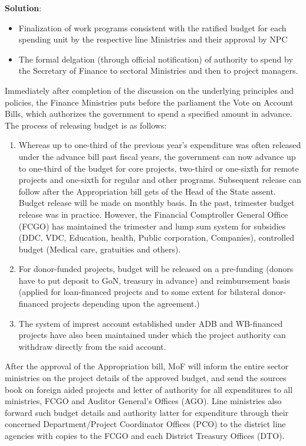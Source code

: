 \documentclass[
]{book}
\newenvironment{solution}{ {\bfseries Solution}:}{}
\begin{document}
\begin{questions}
\begin{solution}
\begin{itemize}
\item Finalization of work programs consistent with the ratified budget for each spending unit by the respective line Ministries and their approval by NPC
\item The formal delgation (through official notification) of authority to spend by the Secretary of Finance to sectoral Ministries and then to project managers.
\end{itemize}

Immediately after completion of the discussion on the underlying principles and policies, the Finance Ministries puts before the parliament the Vote on Account Bills, which authorizes the government to spend a specified amount in advance. The process of releasing budget is as follows:

\begin{enumerate}
\item Whereas up to one-third of the previous year's expenditure was often released under the advance bill past fiscal years, the government can now advance up to one-third of the budget for core projects, two-third or one-sixth for remote projects and one-sixth for regular and other programs. Subsequent release can follow after the Appropriation bill gets of the Head of the State assent. Budget release will be made on monthly basis. In the past, trimester budget release was in practice. However, the Financial Comptroller General Office (FCGO) has maintained the trimester and lump sum system for subsidies (DDC, VDC, Education, health, Public corporation, Companies), controlled budget (Medical care, gratuities and others).
\item For donor-funded projects, budget will be released on a pre-funding (donors have to put deposit to GoN, treasury in advance) and reimbursement basis (applied for loan-financed projects and to some extent for bilateral donor-financed projects depending upon the agreement.)
\item The system of imprest account established under ADB and WB-financed projects have also been maintained under which the project authority can withdraw directly from the said account.
\end{enumerate}

After the approval of the Appropriation bill, MoF will inform the entire sector ministries on the project details of the approved budget, and send the sources book on foreign aided projects and letter of authority for all expenditures to all ministries, FCGO and Auditor General's Offices (AGO). Line ministries also forward such budget details and authority latter for expenditure through their concerned Department/Project Coordinator Offices (PCO) to the district line agencies with copies to the FCGO and each District Treasury Offices (DTO).


\end{solution}
\end{questions}
\end{document}
